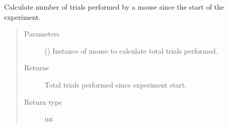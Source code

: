 \documentclass[letterpaper,10pt,english]{sphinxmanual}
\begin{document}
\begin{fulllineitems}
\label{\detokenize{NoSeMazeControl/Analysis:Analysis.Analysis.n_trials_performed}}
\pysigstartsignatures
{}
\pysigstopsignatures
\sphinxAtStartPar
Calculate number of trials performed by a mouse since the start of the
experiment.
\begin{quote}\begin{description}
\item[{Parameters}] \leavevmode
\sphinxAtStartPar
{} () \textendash{} Instance of mouse to calculate total trials performed.

\item[{Returns}] \leavevmode
\sphinxAtStartPar
{} \textendash{} Total trials performed since experiment start.

\item[{Return type}] \leavevmode
\sphinxAtStartPar
int

\end{description}\end{quote}

\end{fulllineitems}

\end{document}
